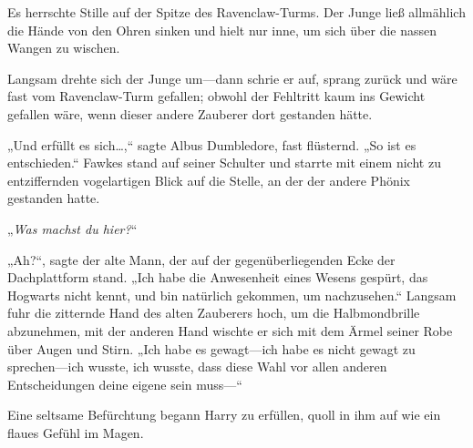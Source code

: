 Es herrschte Stille auf der Spitze des Ravenclaw-Turms. Der Junge ließ allmählich die Hände von den Ohren sinken und hielt nur inne, um sich über die nassen Wangen zu wischen.

Langsam drehte sich der Junge um—dann schrie er auf, sprang zurück und wäre fast vom Ravenclaw-Turm gefallen; obwohl der Fehltritt kaum ins Gewicht gefallen wäre, wenn dieser andere Zauberer dort gestanden hätte.

„Und erfüllt es sich…,“ sagte Albus Dumbledore, fast flüsternd. „So ist es entschieden.“
Fawkes stand auf seiner Schulter und starrte mit einem nicht zu entziffernden vogelartigen Blick auf die Stelle, an der der andere Phönix gestanden hatte.

„\emph{Was machst du hier?}“

„Ah?“, sagte der alte Mann, der auf der gegenüberliegenden Ecke der Dachplattform stand. „Ich habe die Anwesenheit eines Wesens gespürt, das Hogwarts nicht kennt, und bin natürlich gekommen, um nachzusehen.“
Langsam fuhr die zitternde Hand des alten Zauberers hoch, um die Halbmondbrille abzunehmen, mit der anderen Hand wischte er sich mit dem Ärmel seiner Robe über Augen und Stirn.
„Ich habe es gewagt—ich habe es nicht gewagt zu sprechen—ich wusste, ich wusste, dass diese Wahl vor allen anderen Entscheidungen deine eigene sein muss—“

Eine seltsame Befürchtung begann Harry zu erfüllen, quoll in ihm auf wie ein flaues Gefühl im Magen.

